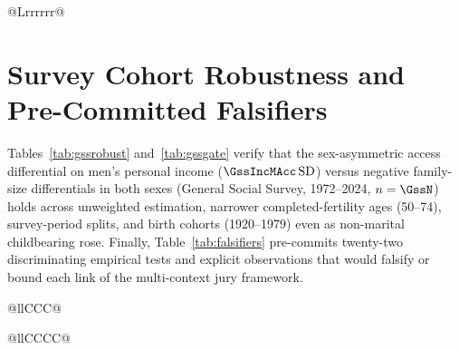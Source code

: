 \begin{table}[!t]
\caption{POV Crossover Robustness Across Sample Restrictions and Outcome Definitions (Ages 25--29 vs.\ 45--49).}\label{tab:pov_sens}
\scriptsize
\renewcommand{\arraystretch}{0.82}
\setlength{\tabcolsep}{4.5pt}
\begin{tabularx}{\textwidth}{@{}Lrrrrrr@{}}
\toprule
{}
\bottomrule
\end{tabularx}
\end{table}

\setcounter{table}{0}
\renewcommand{\thetable}{D\arabic{table}}
\renewcommand{\theHtable}{AppD.tab.\arabic{table}}

\section{Survey Cohort Robustness and Pre-Committed Falsifiers}\label{app:falsifiers}

Tables~\ref{tab:gssrobust} and~\ref{tab:gssgate} verify that the sex-asymmetric access differential on men's personal income ($\GssIncMAcc\SD$) versus negative family-size differentials in both sexes (General Social Survey, 1972--2024, $n=\GssN$) holds across unweighted estimation, narrower completed-fertility ages (50--74), survey-period splits, and birth cohorts (1920--1979) even as non-marital childbearing rose. Finally, Table~\ref{tab:falsifiers} pre-commits twenty-two discriminating empirical tests and explicit observations that would falsify or bound each link of the multi-context jury framework.

\begin{table}[!t]
\caption{Robustness of the Access--Number Selection Decomposition Across Survey Weights, Age Windows, and Periods (GSS 1972--2024).}\label{tab:gssrobust}
\scriptsize
\renewcommand{\arraystretch}{0.80}
\begin{tabularx}{\textwidth}{@{}llCCC@{}}
\toprule
{}
\bottomrule
\end{tabularx}
\vspace{2pt}
\caption{The Pairing Gate Across Birth Cohorts: Never-Married Share, Non-Marital Parenthood, and Male Income Pairing Differential.}\label{tab:gssgate}
\begin{tabularx}{\textwidth}{@{}llCCCC@{}}
\toprule
{}
\bottomrule
\end{tabularx}
\end{table}

